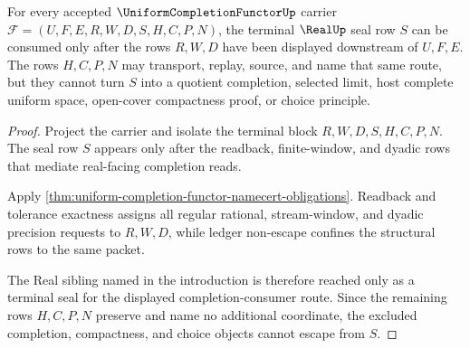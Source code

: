 \begin{theorem}
\label{thm:uniformcompletionfunctor-real-seal-nonescape}
For every accepted $\UniformCompletionFunctorUp$ carrier $\mathcal{F}=(U,F,E,R,W,D,S,H,C,P,N)$, the terminal $\RealUp$ seal row $S$ can be consumed only after the rows $R,W,D$ have been displayed downstream of $U,F,E$. The rows $H,C,P,N$ may transport, replay, source, and name that same route, but they cannot turn $S$ into a quotient completion, selected limit, host complete uniform space, open-cover compactness proof, or choice principle.
\end{theorem}
\begin{proof}
Project the carrier and isolate the terminal block $R,W,D,S,H,C,P,N$. The seal row $S$ appears only after the readback, finite-window, and dyadic rows that mediate real-facing completion reads.

Apply \autoref{thm:uniform-completion-functor-namecert-obligations}. Readback and tolerance exactness assigns all regular rational, stream-window, and dyadic precision requests to $R,W,D$, while ledger non-escape confines the structural rows to the same packet.

The Real sibling named in the introduction is therefore reached only as a terminal seal for the displayed completion-consumer route. Since the remaining rows $H,C,P,N$ preserve and name no additional coordinate, the excluded completion, compactness, and choice objects cannot escape from $S$.
\end{proof}

